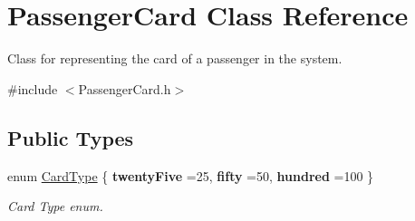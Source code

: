 \hypertarget{classPassengerCard}{}\section{Passenger\+Card Class Reference}
\label{classPassengerCard}


Class for representing the card of a passenger in the system.  




{\ttfamily \#include $<$Passenger\+Card.\+h$>$}

\subsection*{Public Types}
\begin{DoxyCompactItemize}
\item 
\mbox{\label{classPassengerCard_ac30388c823af514403463a797e2878af}} 
enum \mbox{\hyperlink{classPassengerCard_ac30388c823af514403463a797e2878af}{Card\+Type}} \{ {\bfseries twenty\+Five} =25, 
{\bfseries fifty} =50, 
{\bfseries hundred} =100
 \}
\begin{DoxyCompactList}\small\item\em Card Type enum. \end{DoxyCompactList}\end{DoxyCompactItemize}
